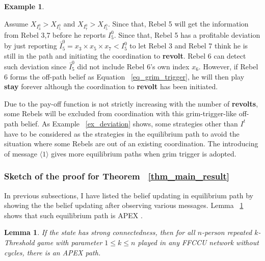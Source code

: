 \documentclass[12pt,letterpaper]{article}
\newtheorem{lemma}{Lemma}[section]
\theoremstyle{definition}
\newtheorem{example}{Example}[section]
\theoremstyle{remark}
\theoremstyle{claim}
\begin{document}
\begin{example}
\begin{center}
\end{center}

Assume $X_{I^0_3}>X_{I^0_5}$ and $X_{I^0_7}>X_{I^0_5}$. Since that, Rebel 5 will get the information from Rebel 3,7 before he reports $I^0_5$. Since that, Rebel 5 has a profitable deviation by just reporting $\bar{I}^0_5=x_3\times x_5\times x_7<I^0_5$ to let Rebel 3 and Rebel 7 think he is still in the path and initiating the coordination to \textbf{revolt}. Rebel 6 can detect such deviation since $\bar{I}^0_5$ did not include Rebel 6's own index $x_6$. However, if Rebel 6 forms the off-path belief as Equation ~\ref{eq_grim_trigger}, he will then play \textbf{stay} forever although the coordination to \textbf{revolt} has been initiated.

\end{example}

Due to the pay-off function is not strictly increasing with the number of \textbf{revolts}, some Rebels will be excluded from coordination with this grim-trigger-like off-path belief. As Example ~\ref{ex_deviation} shows, some strategies other than $I^t$ have to be considered as the strategies in the equilibrium path to avoid the situation where some Rebels are out of an existing coordination. The introducing of message $\langle 1 \rangle$ gives more equilibrium paths when grim trigger is adopted. 

\subsubsection{Sketch of the proof for Theorem ~\ref{thm_main_result}}

In previous subsections, I have listed the belief updating in equilibrium path by showing the the belief updating after observing various messages. Lemma ~\ref{lemma_in_the_path} shows that such equilibrium path is APEX . 
\begin{lemma}\label{lemma_in_the_path}
If the state has strong connectedness, then for all $n$-person repeated $k$-Threshold game with parameter $1\leq k\leq n$ played in any FFCCU network without cycles, there is an APEX path.
\end{lemma}
\end{document}
